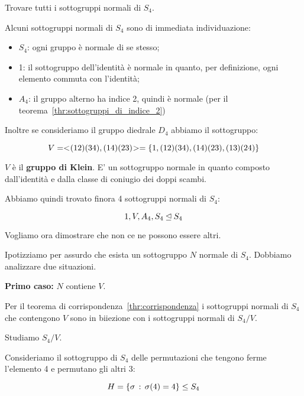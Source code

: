 \begin{esercizio}
	\label{ex:sottogruppi_normali_s4}
	Trovare tutti i sottogruppi normali di $S_4$.
\end{esercizio}
\begin{soluzione}
	Alcuni sottogruppi normali di $S_4$ sono di immediata individuazione:
	
	\begin{itemize}
		\item $S_4$: ogni gruppo è normale di se stesso;
		\item 1: il sottogruppo dell'identità è normale in quanto, per definizione, ogni elemento commuta con l'identità;
		\item $A_4$: il gruppo alterno ha indice 2, quindi è normale (per il teorema~\ref{thr:sottogruppi_di_indice_2})
	\end{itemize}

	Inoltre se consideriamo il gruppo diedrale $D_4$ abbiamo il sottogruppo:
	
	\begin{equation}
		V = < \negmedspace (12)(34), (14)(23) \negmedspace > = \{1, (12)(34), (14)(23), (13)(24)\}
	\end{equation}

	$V$ è il \textbf{gruppo di Klein}. E' un sottogruppo normale in quanto composto dall'identità e dalla classe di coniugio dei doppi scambi.
	
	Abbiamo quindi trovato finora 4 sottogruppi normali di $S_4$:
	
	\begin{equation}
		1, V, A_4, S_4 \unlhd S_4
	\end{equation}

	Vogliamo ora dimostrare che non ce ne possono essere altri.
	
	Ipotizziamo per assurdo che esista un sottogruppo $N$ normale di $S_4$. Dobbiamo analizzare due situazioni.
	
	\textbf{Primo caso:} $N$ contiene $V$.
	
	Per il teorema di corrispondenza~\ref{thr:corrispondenza} i sottogruppi normali di $S_4$ che contengono $V$ sono in biiezione con i sottogruppi normali di $S_4/V$.
	
	Studiamo $S_4/V$.
	
	Consideriamo il sottogruppo di $S_4$ delle permutazioni che tengono ferme l'elemento 4 e permutano gli altri 3:
	
	\begin{equation}
		H = \{\sigma \,:\, \sigma(4) = 4\} \le S_4
	\end{equation}


\end{soluzione}
